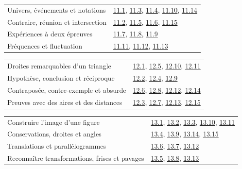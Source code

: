 \begin{tabularx}{\linewidth}{@{}Yl@{}}\toprule
Univers, événements et notations & \hyperref[exo-11-1]{11.1}, \hyperref[exo-11-3]{11.3}, \hyperref[exo-11-4]{11.4}, \hyperref[exo-11-10]{11.10}, \hyperref[exo-11-14]{11.14}\\[2mm]
Contraire, réunion et intersection & \hyperref[exo-11-2]{11.2}, \hyperref[exo-11-5]{11.5}, \hyperref[exo-11-6]{11.6}, \hyperref[exo-11-15]{11.15}\\[2mm]
Expériences à deux épreuves & \hyperref[exo-11-7]{11.7}, \hyperref[exo-11-8]{11.8}, \hyperref[exo-11-9]{11.9}\\[2mm]
Fréquences et fluctuation & \hyperref[exo-11-11]{11.11}, \hyperref[exo-11-12]{11.12}, \hyperref[exo-11-13]{11.13}\\[2mm]
\bottomrule\end{tabularx}\par\vspace{4mm}
\begin{tabularx}{\linewidth}{@{}Yl@{}}\toprule
Droites remarquables d’un triangle & \hyperref[exo-12-1]{12.1}, \hyperref[exo-12-5]{12.5}, \hyperref[exo-12-10]{12.10}, \hyperref[exo-12-11]{12.11}\\[2mm]
Hypothèse, conclusion et réciproque & \hyperref[exo-12-2]{12.2}, \hyperref[exo-12-4]{12.4}, \hyperref[exo-12-9]{12.9}\\[2mm]
Contraposée, contre-exemple et absurde & \hyperref[exo-12-6]{12.6}, \hyperref[exo-12-8]{12.8}, \hyperref[exo-12-12]{12.12}, \hyperref[exo-12-14]{12.14}\\[2mm]
Preuves avec des aires et des distances & \hyperref[exo-12-3]{12.3}, \hyperref[exo-12-7]{12.7}, \hyperref[exo-12-13]{12.13}, \hyperref[exo-12-15]{12.15}\\[2mm]
\bottomrule\end{tabularx}\par\vspace{4mm}
\clearpage
{}\fontsize{10}{13}\selectfont
{}\begin{tabularx}{\linewidth}{@{}Yl@{}}\toprule
Construire l’image d’une figure & \hyperref[exo-13-1]{13.1}, \hyperref[exo-13-2]{13.2}, \hyperref[exo-13-3]{13.3}, \hyperref[exo-13-10]{13.10}, \hyperref[exo-13-11]{13.11}\\[2mm]
Conservations, droites et angles & \hyperref[exo-13-4]{13.4}, \hyperref[exo-13-9]{13.9}, \hyperref[exo-13-14]{13.14}, \hyperref[exo-13-15]{13.15}\\[2mm]
Translations et parallélogrammes & \hyperref[exo-13-6]{13.6}, \hyperref[exo-13-7]{13.7}, \hyperref[exo-13-12]{13.12}\\[2mm]
Reconnaître transformations, frises et pavages & \hyperref[exo-13-5]{13.5}, \hyperref[exo-13-8]{13.8}, \hyperref[exo-13-13]{13.13}\\[2mm]
\bottomrule\end{tabularx}\par\vspace{4mm}
